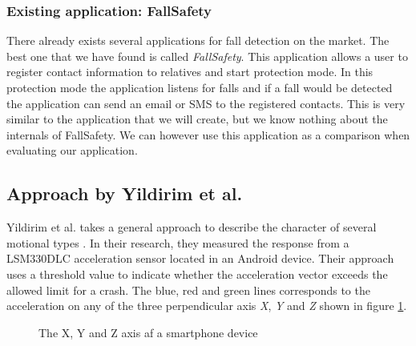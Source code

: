 \documentclass[12pt, a4paper, onecolumn]{article}
\begin{document}
	\subsubsection{Existing application: FallSafety}
	
	There already exists several applications for fall detection on the market. The best one that we have found is called \textit{FallSafety}. This application allows a user to register contact information to relatives and start protection mode. In this protection mode the application listens for falls and if a fall would be detected the application can send an email or SMS to the registered contacts. This is very similar to the application that we will create, but we know nothing about the internals of FallSafety. We can however use this application as a comparison when evaluating our application.
	
	\subsection{Approach by Yildirim et al.}
	Yildirim et al. takes a general approach to describe the character of several motional types \cite{int_journ}. In their research, they measured the response from a LSM330DLC acceleration sensor located in an Android device. Their approach uses a threshold value to indicate whether the acceleration vector exceeds the allowed limit for a crash. The blue, red and green lines corresponds to the acceleration on any of the three perpendicular axis \textit{X}, \textit{Y} and \textit{Z} shown in figure \ref{fig:XYZ-Axis}.
	
	\begin{figure}[H]
		\centering
		\caption{The X, Y and Z axis af a smartphone device}%
		\label{fig:XYZ-Axis}%
	\end{figure}
	
\end{document}
